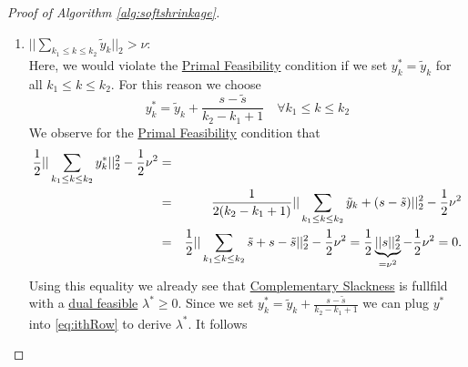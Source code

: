 \begin{proof}[Proof of Algorithm \ref{alg:softshrinkage}]
\begin{enumerate}
                    \item $||\sum\limits_{k_{1} \le k \le k_{2}} \tilde{y}_{k}||_{2} > \nu$:\\
                    Here, we would violate the \underline{Primal Feasibility} condition if we set $y^{\ast}_{k} = \tilde{y}_{k}$ for all $k_{1} \le k \le k_{2}$. For this reason we choose
                        $$y^{\ast}_{k} = \tilde{y}_{k} + \frac{s - \tilde{s}}{k_{2} - k_{1} + 1} \,\,\,\,\,\, \forall k_{1} \le k \le k_{2}$$
                    We observe for the \underline{Primal Feasibility} condition that
                        \begin{eqnarray}
                            \frac{1}{2} ||\sum_{k_{1} \le k \le k_{2}} y^{\ast}_{k}||_{2}^{2} - \frac{1}{2} \nu^{2} &=& \label{eq:caseTwo} \\
                            &=& \frac{1}{2(k_{2} - k_{1} + 1)} ||\sum_{k_{1} \le k \le k_{2}} \tilde{y}_{k} + (s - \tilde{s})||_{2}^{2} - \frac{1}{2} \nu^{2}\notag \\
                            &=& \frac{1}{2} ||\sum_{k_{1} \le k \le k_{2}} \tilde{s} + s - \tilde{s}||_{2}^{2} - \frac{1}{2} \nu^{2} = \frac{1}{2} \underbrace{||s||_{2}^{2}}_{= \nu^{2}} - \frac{1}{2} \nu^{2} = 0. \notag
                        \end{eqnarray}
                    Using this equality we already see that \underline{Complementary Slackness} is fullfild with a \underline{dual feasible} $\lambda^{\ast} \ge 0$. Since we set $y^{\ast}_{k} = \tilde{y}_{k} + \frac{s - \tilde{s}}{k_{2} - k_{1} + 1}$ we can plug $y^{\ast}$ into \ref{eq:ithRow} to derive $\lambda^{\ast}$. It follows %


\end{enumerate}
\end{proof}
